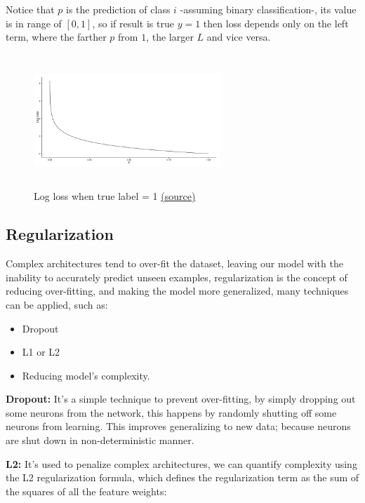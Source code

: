 Notice that $p$ is the prediction of class $i$ -assuming binary classification-, its value is in range of $[0,1]$, so if result is true $y=1$ then loss depends only on the left term, where the farther $p$ from $1$, the larger $L$ and vice versa.

\begin{figure}[h]
    \centering
    \includegraphics[width=7cm,height=5cm]{images/cross_entropy.png}
    \caption{Log loss when true label = 1 \href{https://ml-cheatsheet.readthedocs.io/en/latest/loss_functions.html}{(\underline{source})}}
    \label{cross_entropy}
\end{figure}

\subsection{Regularization}
\label{regularization}
Complex architectures tend to over-fit the dataset, leaving our model with the inability to accurately predict unseen examples, regularization is the concept of reducing over-fitting, and making the model more generalized, many techniques can be applied, such as:
\begin{itemize}
  \item Dropout
  \item L1 or L2
  \item Reducing model's complexity.
\end{itemize} 

\textbf{Dropout: }It’s a simple technique to prevent over-fitting, by simply dropping out some neurons from the network, this happens by randomly shutting off some neurons from learning. This improves generalizing to new data; because neurons are shut down in non-deterministic manner.\newline

\textbf{L2: }It's used to penalize complex architectures, we can quantify complexity using the L2 regularization formula, which defines the regularization term as the sum of the squares of all the feature weights:

